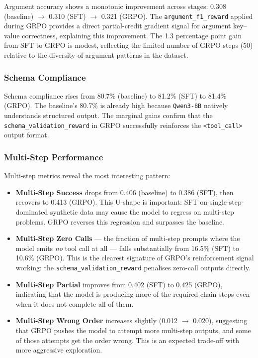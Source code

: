 \documentclass[12pt, a4paper]{article}
\begin{document}
Argument accuracy shows a monotonic improvement across stages: 0.308
(baseline) $\rightarrow$ 0.310 (SFT) $\rightarrow$ 0.321 (GRPO). The
\texttt{argument\_f1\_reward} applied during GRPO provides a direct partial-credit
gradient signal for argument key--value correctness, explaining this improvement.
The 1.3 percentage point gain from SFT to GRPO is modest, reflecting the
limited number of GRPO steps (50) relative to the diversity of argument patterns
in the dataset.

\subsubsection{Schema Compliance}

Schema compliance rises from 80.7\% (baseline) to 81.2\% (SFT) to 81.4\%
(GRPO). The baseline's 80.7\% is already high because \texttt{Qwen3-8B} natively
understands structured output. The marginal gains confirm that the \texttt{schema\_validation\_reward}
in GRPO successfully reinforces the \texttt{<tool\_call>} output format.

\subsubsection{Multi-Step Performance}

Multi-step metrics reveal the most interesting pattern:

\begin{itemize}[leftmargin=1.5em, itemsep=5pt]
  \item \textbf{Multi-Step Success} drops from 0.406 (baseline) to 0.386
    (SFT), then recovers to 0.413 (GRPO). This U-shape is important: SFT on
    single-step-dominated synthetic data may cause the model to regress on
    multi-step problems. GRPO reverses this regression and surpasses the
    baseline.
  \item \textbf{Multi-Step Zero Calls} --- the fraction of multi-step prompts
    where the model emits \textit{no} tool call at all --- falls substantially
    from 16.5\% (SFT) to 10.6\% (GRPO). This is the clearest signature of
    GRPO's reinforcement signal working: the \texttt{schema\_validation\_reward}
    penalises zero-call outputs directly.
  \item \textbf{Multi-Step Partial} improves from 0.402 (SFT) to 0.425 (GRPO),
    indicating that the model is producing more of the required chain steps even
    when it does not complete all of them.
  \item \textbf{Multi-Step Wrong Order} increases slightly (0.012 $\rightarrow$
    0.020), suggesting that GRPO pushes the model to attempt more multi-step
    outputs, and some of those attempts get the order wrong. This is an expected
    trade-off with more aggressive exploration.
\end{itemize}
\end{document}

